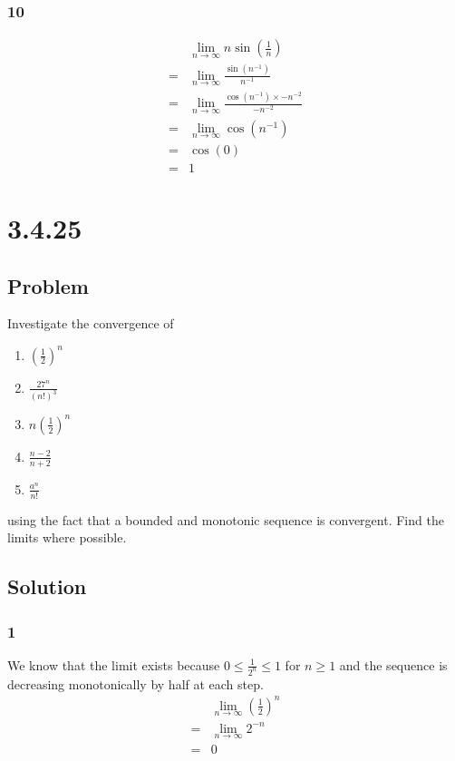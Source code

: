 \documentclass[12pt]{article}
\newcommand{\round}[1]{\left(       #1 \right)      }
\begin{document}
\subsubsection*{10}
\begin{align*}
     & \lim_{n\to\infty} n \sin\round{\frac{1}{n}} \\
    =& \lim_{n\to\infty} \frac{\sin\round{n^{-1}}}{n^{-1}} \\
    =& \lim_{n\to\infty} \frac{\cos\round{n^{-1}} \times -n^{-2}}{-n^{-2}} \\
    =& \lim_{n\to\infty} \cos\round{n^{-1}} \\
    =& \cos(0) \\
    =& 1
\end{align*}



\section*{3.4.25}

\subsection*{Problem}
Investigate the convergence of
\begin{enumerate}
    \item $\round{\frac{1}{2}}^n$
    \item $\frac{27^n}{(n!)^3}$
    \item $n \round{\frac{1}{2}}^n$
    \item $\frac{n - 2}{n + 2}$
    \item $\frac{a^n}{n!}$
\end{enumerate}
using the fact that a bounded and monotonic sequence is convergent. Find the limits where possible.

\subsection*{Solution}

\subsubsection*{1}
We know that the limit exists because $0 \leq \frac{1}{2^n} \leq 1$ for $n \geq 1$ and the sequence is decreasing monotonically by half at each step.
\begin{align*}
     & \lim_{n\to\infty} \round{\frac{1}{2}}^n \\
    =& \lim_{n\to\infty} 2^{-n} \\
    =& 0
\end{align*}
\end{document}
